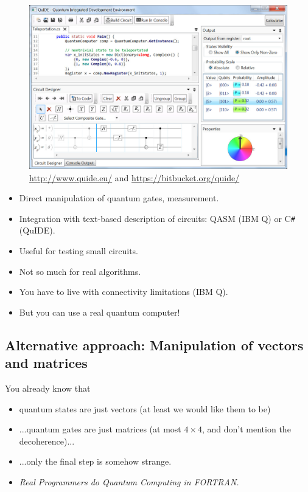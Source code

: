 \documentclass[a4paper,11pt]{article}
\begin{document}
\begin{figure}[ht!]
\centering
\includegraphics[width=\textwidth]{../slides/pics/QuIDE_GUI.jpg}
\caption{\url{http://www.quide.eu/} and 
\url{https://bitbucket.org/quide/}}
\end{figure}
     



\begin{itemize}
\item Direct manipulation of quantum gates, measurement.
\item Integration with text-based description of circuits: QASM 
(IBM Q) or C\texttt{\#} (QuIDE).
\item Useful for testing small circuits.
\item Not so much for real algorithms.
\item You have to live with connectivity limitations (IBM Q).
\item But you can use a real quantum computer!
\end{itemize}


\subsection{Alternative approach: Manipulation of vectors and matrices}

You already know that
\begin{itemize}
    \item quantum states are just vectors (at least we would like them 
    to 
    be)
    \item ...quantum gates are just matrices (at most $4\times 4$, and 
    don't mention the decoherence)...
    \item ...only the final step is somehow strange.
    \item{\emph{Real Programmers do Quantum Computing in FORTRAN.}}
\end{itemize}
\end{document}
